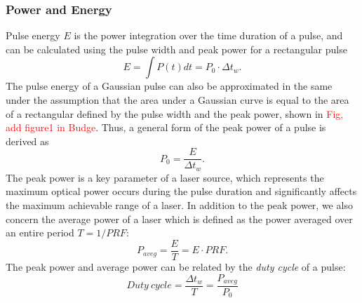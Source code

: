 \subsubsection{Power and Energy} \label{sec:pw}
Pulse energy $E$ is the power integration over the time duration of a pulse, and can be calculated using the pulse width and peak power for a rectangular pulse
\begin{equation} \label{eq:energy}
E=\int P(t)dt=P_0\cdot \Delta t_w.
\end{equation}
The pulse energy of a Gaussian pulse can also be approximated in the same under the assumption that the area under a Gaussian curve is equal to the area of a rectangular defined by the pulse width and the peak power, shown in \textcolor{red}{Fig, add figure1 in Budge}. Thus, a general form of the peak power of a pulse is derived as
\begin{equation}\label{eq:pw}
P_0=\frac{E}{\Delta t_w}.
\end{equation}
The peak power is a key parameter of a laser source, which represents the maximum optical power occurs during the pulse duration and significantly affects the maximum achievable range of a laser. In addition to the peak power, we also concern the average power of a laser which is defined as the power averaged over an entire period $T=1/\mathit{PRF}$:
\begin{equation}
P_{aveg}=\frac{E}{T}=E\cdot \mathit{PRF}.    
\end{equation}
The peak power and average power can be related by the \emph{duty cycle} of a pulse:
\begin{equation}
Duty~cycle= \frac{\Delta t_w}{T}=\frac{P_{aveg}}{P_0}    
\end{equation}


